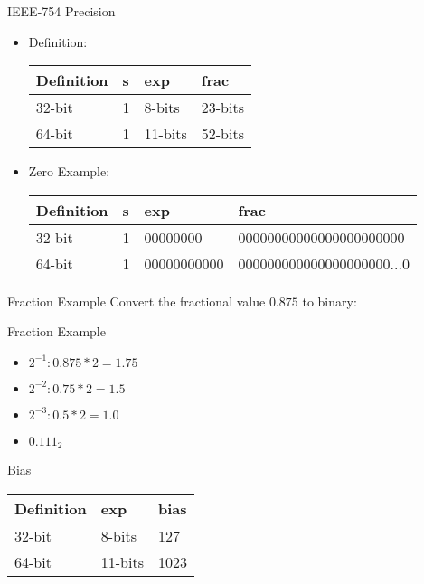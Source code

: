 \begin{frame}{IEEE-754 Precision}
  \begin{itemize}
    \item Definition: \\
  \begin{tabular}{|l|l|l|l|}
    \hline
    Definition & s & exp     & frac    \\ \hline
    32-bit     & 1 & 8-bits  & 23-bits \\ \hline
    64-bit     & 1 & 11-bits & 52-bits \\ \hline
  \end{tabular}
\item Zero Example: \\
    \begin{tabular}{|l|l|l|l|}
    \hline
    Definition & s & exp         & frac    \\ \hline
    32-bit     & 1 & 00000000    & 00000000000000000000000 \\ \hline
    64-bit     & 1 & 00000000000 & 000000000000000000000...0 \\ \hline
  \end{tabular}
  \end{itemize}
\end{frame}
\begin{frame}{Fraction Example}
  Convert the fractional value $0.875$ to binary:
\end{frame}
\begin{frame}{Fraction Example}
    \begin{itemize}
    \item $2^{-1}: 0.875 * 2 = 1.75$
    \item $2^{-2}: 0.75 * 2 = 1.5$
    \item $2^{-3}: 0.5 * 2 = 1.0$
      \item $0.111_{2}$
  \end{itemize}
\end{frame}
\begin{frame}{Bias}
    \begin{tabular}{|l|l|l|}
    \hline
    Definition & exp     & bias \\ \hline
    32-bit     & 8-bits  & 127  \\ \hline
    64-bit     & 11-bits & 1023 \\ \hline
  \end{tabular}
\end{frame}

